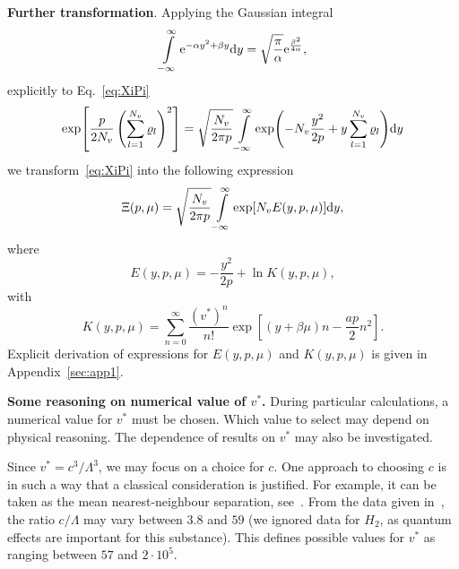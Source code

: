 \documentclass[12pt]{article}
\numberwithin{equation}{section}
\begin{document}
	\textbf{Further transformation}. Applying the Gaussian integral
	\begin{equation}
		\int\limits_{-\infty}^{\infty} {\rm e}^{-\alpha y^2 + \beta y} {\rm d}y = \sqrt{\frac{\pi}{\alpha}} {\rm e}^{\frac{\beta^2}{4\alpha}},
	\end{equation}
	explicitly to Eq.~\eqref{eq:XiPi}
	\begin{equation}
		\label{eq:gaussInt}
		\exp[\frac{p}{2N_v}\left(\sum_{l=1}^{N_v} \varrho_l\right)^2] = \sqrt{\frac{N_v}{2\pi p}}
		\int\limits_{-\infty}^{\infty} \exp(-N_v \frac{y^2}{2p} + y\sum_{l=1}^{N_v} \varrho_l) {\rm d}y
	\end{equation}
	we transform~\eqref{eq:XiPi} into the following expression
	\begin{equation}
		\label{eq:XiInty}
		\Xi (p, \mu) = \sqrt{\frac{N_v}{2\pi p}} \int\limits_{-\infty}^{\infty} \exp[N_v E(y, p, \mu)] {\rm d} y,
	\end{equation}
	where 
	\begin{equation}
		\label{def:E}
		E(y,p,\mu) = -\frac{y^2}{2p} + \ln K(y,p,\mu),
	\end{equation}
	with
	\begin{equation}
		\label{def:K}
		K(y,p,\mu) = \sum_{n=0}^{\infty} \frac{(v^*)^n}{n!} \exp[(y+\beta\mu)n - \frac{ap}{2}n^2].
	\end{equation}
	Explicit derivation of expressions for $E(y,p,\mu)$ and $K(y,p,\mu)$ is given in Appendix~\ref{sec:app1}.
	
	\textbf{Some reasoning on numerical value of $v^*$.} During particular calculations, a numerical value for $v^*$ must be chosen. Which value to select may depend on physical reasoning. The dependence of results on $v^*$ may also be investigated.
	
	Since $v^* = c^3/\Lambda^3$, we may focus on a choice for $c$. One approach to choosing $c$ is in such a way that a classical consideration is justified. For example, it can be taken as the mean nearest-neighbour separation, see~\cite[Sec.~1.1]{HansenMcDonald13}. From the data given in~\cite[Table~1.1]{HansenMcDonald13}, the ratio $c/\Lambda$ may vary between $3.8$ and $59$ (we ignored data for $H_2$, as quantum effects are important for this substance). This defines possible values for $v^*$ as ranging between $57$ and $2 \cdot 10^5$.
	
\end{document}
